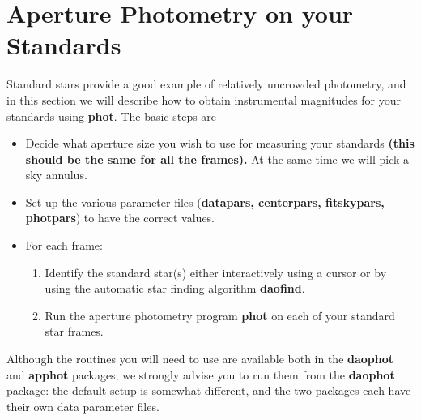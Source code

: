  
\section{Aperture Photometry on your Standards}
 
Standard stars provide a good example of relatively uncrowded
photometry,
and in this section we will describe how to obtain instrumental
magnitudes for your standards using {\bf phot}. 
The basic steps are 
\begin{itemize}
	\item Decide what aperture size you wish to use for measuring your
	standards {\bf (this should be the same for all the frames).} At the
	same time we will pick a sky annulus. 
	\item Set up the various parameter files ({\bf datapars,
		centerpars, fitskypars, photpars}) to have the correct values.
	\item For each frame:
		\begin{enumerate}
		\item Identify the standard star(s) either 
		       interactively using a cursor
			or by using the automatic star finding algorithm
			{\bf daofind}.
		\item Run the aperture photometry program {\bf phot}
		      on each of your standard star frames.
\end{enumerate}
\end{itemize} 
Although the routines you will need to use are available both in the
{\bf daophot} and {\bf apphot} packages, we strongly advise you to run
them from the {\bf daophot} package: the default setup is somewhat different,
and the two packages each have their own data parameter files.

